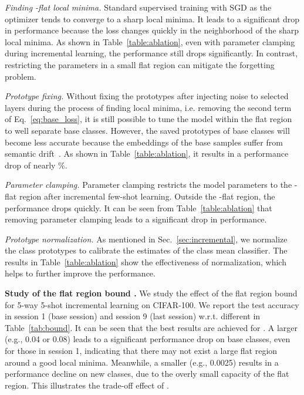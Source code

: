 \documentclass{article}
\begin{document}
\noindent
\emph{Finding -flat local minima.} 
Standard supervised training with SGD as the optimizer tends to converge to a sharp local minima. It leads to a significant drop in performance because the loss changes quickly in the neighborhood of the sharp local minima. As shown in Table~\ref{table:ablation}, even with parameter clamping during incremental learning, 
the performance still drops significantly.
In contrast, restricting the parameters in a small flat region can mitigate the forgetting problem.

\noindent
\emph{Prototype fixing.}
Without fixing the prototypes after injecting noise to selected layers during the process of finding local minima, i.e. removing the second term of Eq.~\ref{eq:base_loss}, it is still possible to tune the model within the flat region to well separate base classes. However, the saved prototypes of base classes will become less accurate because 
the embeddings of the base samples suffer from semantic drift~\cite{Yu2020SemanticDC}. 
As shown in Table~\ref{table:ablation}, it results in a performance drop of nearly \%.

\noindent
\emph{Parameter clamping.}
Parameter clamping restricts the model parameters to the -flat region after incremental few-shot learning. Outside the -flat region, the performance drops quickly. It can be seen from Table~\ref{table:ablation} that removing parameter clamping leads to a significant drop in performance. 


\noindent
\emph{Prototype normalization.} 
As mentioned in Sec.~\ref{sec:incremental}, we normalize the class prototypes to calibrate the estimates of the class mean classifier. 
The results in Table~\ref{table:ablation} show the effectiveness of normalization, which helps to further improve the performance.

\textbf{Study of the flat region bound .} We study the effect of the flat region bound  for 5-way 5-shot incremental learning on CIFAR-100. We report the test accuracy in session 1 (base session) and session 9 (last session) w.r.t. different  in Table~\ref{tab:bound}. It can be seen that the best results are achieved for . A larger  (e.g., 0.04 or 0.08) leads to a significant performance drop on base classes, even for those in session 1, indicating that there may not exist a large flat region around a good local minima. Meanwhile, a smaller  (e.g., 0.0025) results in a performance decline on new classes, due to the overly small capacity of the flat region. This illustrates the trade-off effect of .
\end{document}
